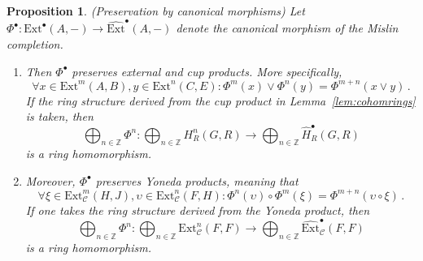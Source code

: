 \documentclass[12pt, a4paper]{article}
\numberwithin{equation}{section}
\newtheorem{prop}[thm]{Proposition}
\theoremstyle{empty}
\theoremstyle{nonumberplain}
\begin{document}
\begin{prop}\label{prop:canisringhomom}
(Preservation by canonical morphisms)\newline
Let $\Phi^{\bullet}: \mathrm{Ext}^{\bullet}(A, -) \rightarrow \widehat{\mathrm{Ext}}^{\bullet}(A, -)$ denote the canonical morphism of the Mislin completion.
\begin{enumerate}
    \item Then $\Phi^{\bullet}$ preserves external and cup products. More specifically,
    \[ \forall x \in \mathrm{Ext}^m(A, B), y \in \mathrm{Ext}^n(C, E): \Phi^m(x) \vee \Phi^n(y) = \Phi^{m+n}(x \vee y) \, . \]
    If the ring structure derived from the cup product in Lemma~\ref{lem:cohomrings} is taken, then 
    \[ \bigoplus_{n \in \mathbb{Z}} \Phi^n: \bigoplus_{n \in \mathbb{Z}} H_R^n(G, R) \rightarrow \bigoplus_{n \in \mathbb{Z}} \widehat{H}_R^{\bullet}(G, R) \]
    is a ring homomorphism.
    \item Moreover, $\Phi^{\bullet}$ preserves Yoneda products, meaning that
    \[ \forall \xi \in \mathrm{Ext}_{\mathcal{C}}^m(H, J), \upsilon \in \mathrm{Ext}_{\mathcal{C}}^n(F, H): \Phi^n(\upsilon) \circ \Phi^m(\xi) = \Phi^{m+n}(\upsilon \circ \xi) \, . \]
    If one takes the ring structure derived from the Yoneda product, then
    \[ \bigoplus_{n \in \mathbb{Z}} \Phi^n: \bigoplus_{n \in \mathbb{Z}} \mathrm{Ext}_{\mathcal{C}}^n(F, F) \rightarrow \bigoplus_{n \in \mathbb{Z}} \widehat{\mathrm{Ext}}_{\mathcal{C}}^{\bullet}(F, F) \]
    is a ring homomorphism.
\end{enumerate}
\end{prop}
\end{document}
